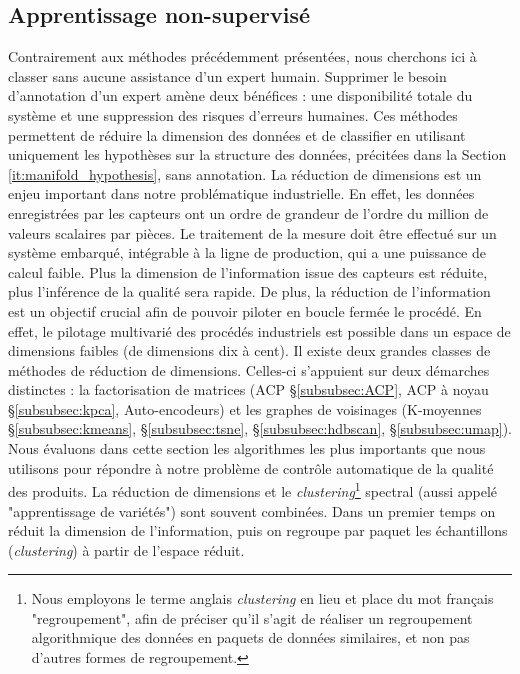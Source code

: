 \subsection{Apprentissage non-supervisé} \label{subsec:unsupervised}
Contrairement aux méthodes précédemment présentées, nous cherchons ici à classer sans aucune assistance d'un expert humain.
Supprimer le besoin d'annotation d'un expert amène deux bénéfices : une disponibilité totale du système et une suppression des risques d'erreurs humaines.
Ces méthodes permettent de réduire la dimension des données et de classifier en utilisant uniquement les hypothèses sur la structure des données, précitées dans la Section \ref{it:manifold_hypothesis}, sans annotation.
La réduction de dimensions est un enjeu important dans notre problématique industrielle.
En effet, les données enregistrées par les capteurs ont un ordre de grandeur de l'ordre du million de valeurs scalaires par pièces.
Le traitement de la mesure doit être effectué sur un système embarqué, intégrable à la ligne de production, qui a une puissance de calcul faible.
Plus la dimension de l'information issue des capteurs est réduite, plus l'inférence de la qualité sera rapide.
De plus, la réduction de l'information est un objectif crucial afin de pouvoir piloter en boucle fermée le procédé.
En effet, le pilotage multivarié des procédés industriels est possible dans un espace de dimensions faibles (de dimensions dix à cent).
Il existe deux grandes classes de méthodes de réduction de dimensions.
Celles-ci s'appuient sur deux démarches distinctes : la factorisation de matrices (ACP §\ref{subsubsec:ACP}, ACP à noyau §\ref{subsubsec:kpca}, Auto-encodeurs) et les graphes de voisinages (K-moyennes §\ref{subsubsec:kmeans}, §\ref{subsubsec:tsne}, §\ref{subsubsec:hdbscan}, §\ref{subsubsec:umap}).
Nous évaluons dans cette section les algorithmes les plus importants que nous utilisons pour répondre à notre problème de contrôle automatique de la qualité des produits.
La réduction de dimensions et le \textit{clustering}\footnote{Nous employons le terme anglais \textit{clustering} en lieu et place du mot français "regroupement", afin de préciser qu'il s'agit de réaliser un regroupement algorithmique des données en paquets de données similaires, et non pas d'autres formes de regroupement.} spectral (aussi appelé "apprentissage de variétés") sont souvent combinées.
Dans un premier temps on réduit la dimension de l'information, puis on regroupe par paquet les échantillons (\textit{clustering}) à partir de l'espace réduit.

